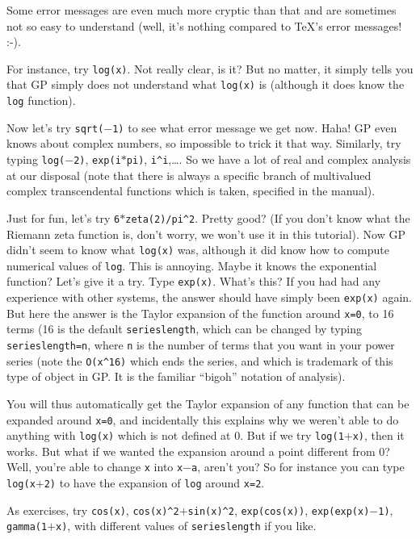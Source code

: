 Some error messages are even much more cryptic than that and are sometimes not so
easy to understand (well, it's nothing compared to \TeX's error messages! :-).

For instance, try {\tt log(x)}. Not really clear, is it? But no matter, it simply
tells you that GP simply does not understand what {\tt log(x)} is (although it
does know the {\tt log} function).

Now let's try {\tt sqrt($-$1)} to see what error message we get now. Haha! GP even
knows about complex numbers, so impossible to trick it that way. Similarly, try
typing {\tt log($-$2)}, {\tt exp(i$*$pi)}, {\tt i\^{}i},\dots. So we have a lot of real and complex
analysis at our disposal (note that there is always a specific branch of
multivalued complex transcendental functions which is taken, specified in the manual).

Just for fun, let's try {\tt 6$*$zeta(2)/pi\^{}2}. Pretty good? (If you
don't know what the Riemann zeta function is, don't worry, we won't
use it in this tutorial).
\medskip
Now GP didn't seem to know what {\tt log(x)} was, although it did know how to compute
numerical values of {\tt log}. This is annoying. Maybe it knows the exponential
function? Let's give it a try. Type {\tt exp(x)}. What's this? If you had had any experience
with other systems, the answer should have simply been {\tt exp(x)} again. But here the
answer is the Taylor expansion of the function around {\tt x=0}, to 16 terms (16 is the
default {\tt serieslength}, which can be changed by typing {\tt \bs serieslength=n},
where {\tt n} is the number of terms that you want in your power series (note the {\tt O(x\^{}16)}
which ends the series, and which is trademark of this type of object in GP. It is the familiar
``bigoh'' notation of analysis).

You will thus automatically get the Taylor expansion of any function that can be expanded
around {\tt x=0}, and incidentally this explains
why we weren't able to do anything with {\tt log(x)} which is not defined at 0. But if we try
{\tt log(1$+$x)}, then it works. But what if we wanted the expansion around a point different
from 0? Well, you're able to change {\tt x} into {\tt x$-$a}, aren't you? So for instance
you can type {\tt log(x$+$2)} to have the expansion of {\tt log} around {\tt x=2}. 

As exercises, try {\tt cos(x)}, {\tt cos(x)\^{}2$+$sin(x)\^{}2}, {\tt exp(cos(x))},
{\tt exp(exp(x)$-$1)}, {\tt gamma(1$+$x)}, with different values of {\tt serieslength} if you like.

